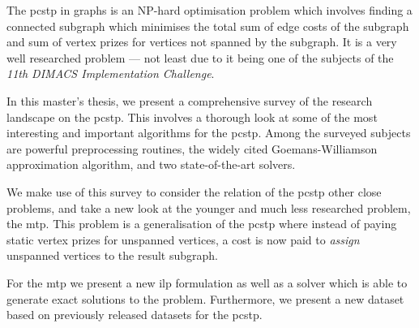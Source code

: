 The \gls{pcstp} in graphs is an NP-hard optimisation problem which involves
finding a connected subgraph which minimises the total sum of edge costs of
the subgraph and sum of vertex prizes for vertices not spanned by the subgraph.
It is a very well researched problem --- not least due to it being one of the
subjects of the \textit{11th DIMACS Implementation Challenge}.

In this master's thesis, we present a comprehensive survey of the research landscape
on the \gls{pcstp}. This involves a thorough look at some of the most interesting
and important algorithms for the \gls{pcstp}. Among the surveyed subjects are
powerful preprocessing routines, the widely cited Goemans-Williamson approximation
algorithm, and two state-of-the-art solvers.

We make use of this survey to consider the relation of the \gls{pcstp} other close
 problems, and take a new look at the younger and much less researched problem, the
\gls{mtp}. This problem is a generalisation of the \gls{pcstp} where instead of paying
static vertex prizes for unspanned vertices, a cost is now paid to \textit{assign}
unspanned vertices to the result subgraph.

For the \gls{mtp} we present a new \acrlong{ilp} formulation as well as a solver which
is able to generate exact solutions to the problem. Furthermore, we present a new
dataset based on previously released datasets for the \gls{pcstp}.

